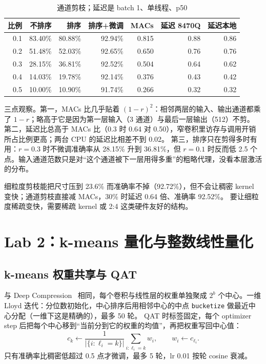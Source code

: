 \documentclass[11pt,a4paper]{ctexart}
\begin{document}
\begin{table}[H]
\centering\small
\caption{通道剪枝；延迟是 batch 1、单线程、p50}\label{tab:ch}
\begin{tabular}{rrrrrrr}
\toprule
比例 & 不排序 & 排序 & 排序+微调 & MACs & 延迟 8470Q & 延迟本地 \\
\midrule
0.1 & 83.40\% & 80.88\% & 92.94\% & 0.815 & 0.88 & 0.86 \\
0.2 & 51.48\% & 52.03\% & 92.65\% & 0.650 & 0.76 & 0.76 \\
0.3 & 28.15\% & 36.81\% & 92.52\% & 0.504 & 0.64 & 0.62 \\
0.4 & 14.03\% & 19.78\% & 92.14\% & 0.376 & 0.43 & 0.42 \\
0.5 & 10.00\% & 10.90\% & 91.74\% & 0.266 & 0.32 & 0.32 \\
\bottomrule
\end{tabular}
\end{table}

三点观察。第一，MACs 比几乎贴着 $(1-r)^2$：相邻两层的输入、输出通道都乘了 $1-r$；略高于它是因为第一层输入（3 通道）与最后一层输出（512）不剪。
第二，延迟比总高于 MACs 比（0.3 时 0.64 对 0.50），窄卷积里访存与调用开销所占比例更高；两台 CPU 的延迟比相差不到 0.02。
第三，排序只在剪得多时有用：$r=0.3$ 时不微调准确率从 28.15\% 升到 36.81\%，但 $r=0.1$ 时反而低 2.5 个点。输入通道范数只是对“这个通道被下一层用得多重”的粗略代理，没看本层激活的分布。

\begin{findingbox}[：Lab 1]
细粒度剪枝能把尺寸压到 23.6\% 而准确率不掉（92.72\%），但不会让稠密 kernel 变快；通道剪枝直接减 MACs，30\% 时延迟 0.64 倍、准确率 92.52\%。
要让细粒度稀疏变快，需要稀疏 kernel 或 2:4 这类硬件友好的结构。
\end{findingbox}

\section{Lab 2：k-means 量化与整数线性量化}\label{sec:lab2}

\subsection{k-means 权重共享与 QAT}
与 Deep Compression~\cite{deepcompression} 相同，每个卷积与线性层的权重单独聚成 $2^b$ 个中心。一维 Lloyd 迭代：分位数初始化，中心排序后用相邻中心的中点 \texttt{bucketize} 做最近中心分配（一维下这是精确的），最多 50 轮。
QAT 时标签固定，每个 optimizer step 后把每个中心移到“当前分到它的权重的均值”，再把权重写回中心值：
\begin{equation}
c_k \leftarrow \frac{1}{|\{i: \ell_i = k\}|}\sum_{i:\ell_i=k} w_i, \qquad w_i \leftarrow c_{\ell_i}.
\end{equation}
只有准确率比稠密低超过 0.5 点才微调，最多 5 轮，lr 0.01 按轮 cosine 衰减。
\end{document}
